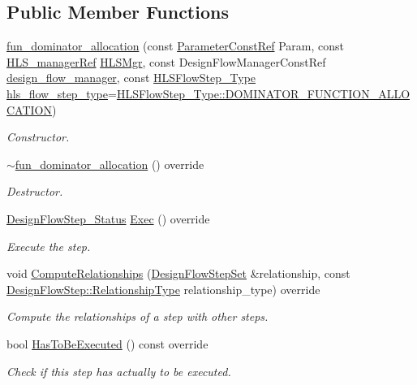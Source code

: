 \subsection*{Public Member Functions}
\begin{DoxyCompactItemize}
\item 
\hyperlink{classfun__dominator__allocation_a65d6cb6a0b0d37997685fa56c234ac75}{fun\+\_\+dominator\+\_\+allocation} (const \hyperlink{Parameter_8hpp_a37841774a6fcb479b597fdf8955eb4ea}{Parameter\+Const\+Ref} Param, const \hyperlink{hls__manager_8hpp_acd3842b8589fe52c08fc0b2fcc813bfe}{H\+L\+S\+\_\+manager\+Ref} \hyperlink{classHLS__step_ade85003a99d34134418451ddc46a18e9}{H\+L\+S\+Mgr}, const Design\+Flow\+Manager\+Const\+Ref \hyperlink{classDesignFlowStep_ab770677ddf087613add30024e16a5554}{design\+\_\+flow\+\_\+manager}, const \hyperlink{hls__step_8hpp_ada16bc22905016180e26fc7e39537f8d}{H\+L\+S\+Flow\+Step\+\_\+\+Type} \hyperlink{classHLS__step_aefd59af15346ec3f10bf12bd756e6777}{hls\+\_\+flow\+\_\+step\+\_\+type}=\hyperlink{hls__step_8hpp_ada16bc22905016180e26fc7e39537f8da7ef76b1892af42231678f55ee395585e}{H\+L\+S\+Flow\+Step\+\_\+\+Type\+::\+D\+O\+M\+I\+N\+A\+T\+O\+R\+\_\+\+F\+U\+N\+C\+T\+I\+O\+N\+\_\+\+A\+L\+L\+O\+C\+A\+T\+I\+ON})
\begin{DoxyCompactList}\small\item\em Constructor. \end{DoxyCompactList}\item 
\hyperlink{classfun__dominator__allocation_afd5906672613cf0531f85838a9ad9dc1}{$\sim$fun\+\_\+dominator\+\_\+allocation} () override
\begin{DoxyCompactList}\small\item\em Destructor. \end{DoxyCompactList}\item 
\hyperlink{design__flow__step_8hpp_afb1f0d73069c26076b8d31dbc8ebecdf}{Design\+Flow\+Step\+\_\+\+Status} \hyperlink{classfun__dominator__allocation_aab3d1e1e5b22f40816fa73325bcab578}{Exec} () override
\begin{DoxyCompactList}\small\item\em Execute the step. \end{DoxyCompactList}\item 
void \hyperlink{classfun__dominator__allocation_aced73fc0e76b139d3fca739237f0542b}{Compute\+Relationships} (\hyperlink{classDesignFlowStepSet}{Design\+Flow\+Step\+Set} \&relationship, const \hyperlink{classDesignFlowStep_a723a3baf19ff2ceb77bc13e099d0b1b7}{Design\+Flow\+Step\+::\+Relationship\+Type} relationship\+\_\+type) override
\begin{DoxyCompactList}\small\item\em Compute the relationships of a step with other steps. \end{DoxyCompactList}\item 
bool \hyperlink{classfun__dominator__allocation_afde71d1d22d09ffa5f2afaf0c73ab4b0}{Has\+To\+Be\+Executed} () const override
\begin{DoxyCompactList}\small\item\em Check if this step has actually to be executed. \end{DoxyCompactList}\end{DoxyCompactItemize}
